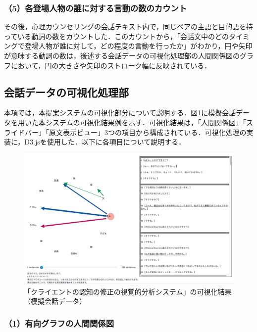 \documentclass[shuuron]{kuee}
\begin{document}
\subsubsection{（5）各登場人物の誰に対する言動の数のカウント}

その後，心理カウンセリングの会話テキスト内で，同じペアの主語と目的語を持っている動詞の数をカウントした．このカウントから，「会話文中のどのタイミングで登場人物が誰に対して，どの程度の言動を行ったか」がわかり，円や矢印が意味する動詞の数は，後述する会話データの可視化処理部の人間関係図のグラフにおいて，円の大きさや矢印のストローク幅に反映されている．


\subsection{会話データの可視化処理部}

本項では，本提案システムの可視化部分について説明する．図\ref{fig:dummyChara}に模擬会話データを用いた本システムの可視化結果例を示す．可視化結果は，「人間関係図」「スライドバー」「原文表示ビュー」3つの項目から構成されている．可視化処理の実装に，D3.js\cite{vand3}を使用した．以下に各項目について説明する．%

\begin{figure}
  \begin{center}
    \includegraphics[width=\linewidth]{dummyChara.png}
  \end{center}
  \caption{「クライエントの認知の修正の視覚的分析システム」の可視化結果（模擬会話データ）}
  \label{fig:dummyChara}
\end{figure}

\subsubsection{（1）有向グラフの人間関係図}
\end{document}
